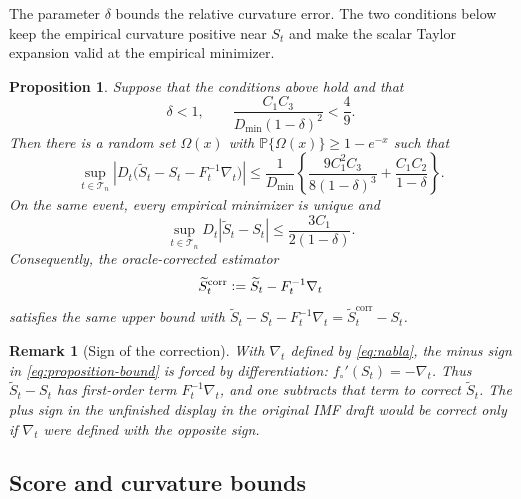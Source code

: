 \documentclass[11pt]{article}
\newcommand{\Pp}{\mathbb{P}}
\newcommand{\eqdef}{\mathrel{\vcentcolon=}}
\newcommand{\IMFs}{S}
\newcommand{\IMFt}{\widetilde S}
\newcommand{\IF}{F}
\newcommand{\DFN}{D}
\newcommand{\xx}{x}
\newtheorem{proposition}{Proposition}[section]
\newtheorem*{remark}{Remark}
\begin{document}
The parameter \(\delta\) bounds the relative curvature error.  The two
conditions below keep the empirical curvature positive near \(S_t\) and
make the scalar Taylor expansion valid at the empirical minimizer.

\begin{proposition}\label{prop:main}
Suppose that the conditions above hold and that
\begin{equation}
  \delta<1,
  \qquad
  \frac{C_1C_3}{\DFN_{\min}(1-\delta)^2}<\frac49.
  \label{eq:smallness}
\end{equation}
Then there is a random set \(\Omega(\xx)\) with
\(\Pp\{\Omega(\xx)\}\geq1-e^{-\xx}\) such that
\begin{equation}
  \sup_{t\in\mathcal T_n}
  \left|
    \DFN_t\bigl(
      \IMFt_t-\IMFs_t-\IF_t^{-1}\nabla_t
    \bigr)
  \right|
  \leq
  \frac{1}{\DFN_{\min}}
  \left\{
    \frac{9C_1^2C_3}{8(1-\delta)^3}
    +\frac{C_1C_2}{1-\delta}
  \right\}.
  \label{eq:proposition-bound}
\end{equation}
On the same event, every empirical minimizer is unique and
\begin{equation}
  \sup_{t\in\mathcal T_n}
  D_t|\widetilde S_t-S_t|\leq\frac{3C_1}{2(1-\delta)}.
  \label{eq:raw-localization}
\end{equation}
Consequently, the oracle-corrected estimator
\begin{equation}
  \IMFt_t^{\mathrm{corr}}
  \eqdef \IMFt_t-\IF_t^{-1}\nabla_t
  \label{eq:corrected-estimator}
\end{equation}
satisfies the same upper bound with
\(\IMFt_t-\IMFs_t-\IF_t^{-1}\nabla_t
=\IMFt_t^{\mathrm{corr}}-\IMFs_t\).
\end{proposition}

\begin{remark}[Sign of the correction]
With \(\nabla_t\) defined by \eqref{eq:nabla}, the minus sign in
\eqref{eq:proposition-bound} is forced by differentiation:
\(f_\circ'(\IMFs_t)=-\nabla_t\).  Thus
\(\IMFt_t-\IMFs_t\) has first-order term \(\IF_t^{-1}\nabla_t\), and one
subtracts that term to correct \(\IMFt_t\).  The plus sign in the unfinished
display in the original IMF draft would be correct only if \(\nabla_t\) were defined
with the opposite sign.
\end{remark}

\subsection{Score and curvature bounds}\label{sec:derivatives}
\end{document}
